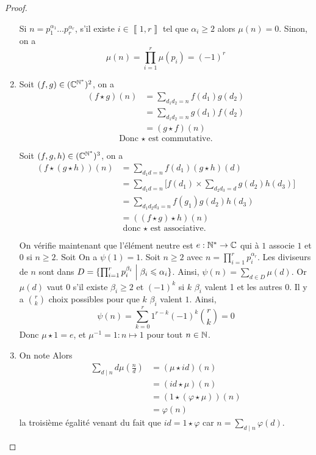 \begin{proof}
\begin{enumerate}
		Si $n=p_{1}^{\alpha_{1}}\dots p_{r}^{\alpha_{r}}$, s'il existe $i\in\left\llbracket 1,r\right\rrbracket$ tel que $\alpha_{i}\geqslant2$ alors $\mu(n)=0$. Sinon, on a 
		\begin{equation}
			\boxed{\mu(n)=\prod_{i=1}^{r}\mu(p_{i})=(-1)^{r}}
		\end{equation}

		\item Soit $(f,g)\in(\mathbb{C}^{\mathbb{N}^{*}})^{2}$, on a 
		\begin{align}
			(f\star g)(n)
			&=\sum_{d_{1}d_{2}=n}f(d_{1})g(d_{2})\\
			&=\sum_{d_{1}d_{2}=n}g(d_{1})f(d_{2})\\
			&=(g\star f)(n)
		\end{align}
		\begin{equation}
			\boxed{\text{Donc }\star\text{ est commutative.}}
		\end{equation}

		Soit $(f,g,h)\in(\mathbb{C}^{\mathbb{N}^{*}})^{3}$, on a 
		\begin{align}
			(f\star (g\star h))(n)
			&=\sum_{d_{1}d=n}f(d_{1})(g\star h)(d)\\
			&=\sum_{d_{1}d=n}\Biggl[f(d_{1})\times \sum_{d_{2}d_{3}=d}g(d_{2})h(d_{3})\Biggr]\\
			&=\sum_{d_{1}d_{2}d_{3}=n}f(g_{1})g(d_{2})h(d_{3})\\
			&=((f\star g)\star h)(n)
		\end{align}
		\begin{equation}
			\boxed{\text{donc }\star\text{ est associative. }}
		\end{equation}

		On vérifie maintenant que l'élément neutre est $e:\mathbb{N}^{*}\to\mathbb{C}$ qui à $1$ associe $1$ et 0 si $n\geqslant2$.
		Soit 
		On a $\psi(1)=1$. Soit $n\geqslant2$ avec $n=\prod_{i=1}^{r}p_{i}^{\alpha_{r}}$. Les diviseurs de $n$ sont dans $D=\{\prod_{i=1}^{r}p_{i}^{\beta_{i}}\Bigm| \beta_{i}\leqslant\alpha_{i}\}$. Ainsi, $\psi(n)=\sum_{d\in D}\mu(d)$. Or $\mu(d)$ vaut 0 s'il existe $\beta_{i}\geqslant2$ et $(-1)^{k}$ si $k$ $\beta_{i}$ valent 1 et les autres 0. Il y a $\binom{r}{k}$ choix possibles pour que $k$ $\beta_{i}$ valent $1$. Ainsi,
		\begin{equation}
			\psi(n)=\sum_{k=0}^{r}1^{r-k}(-1)^{k}\binom{r}{k}=0
		\end{equation}
		Donc $\mu\star 1=e$, et $\mu^{-1}=1\colon n\mapsto 1$ pour tout $n\in\mathbb{N}$.

		\item On note 
		Alors 
		\begin{align}
			\sum_{d\mid n}d\mu(\frac{n}{d})
			&=(\mu\star id)(n)\\
			&=(id\star \mu)(n)\\
			&=(1\star (\varphi\star \mu))(n)\\
			&=\boxed{\varphi(n)}
		\end{align}
		la troisième égalité venant du fait que $id=1\star\varphi$ car $n=\sum_{d\mid n}\varphi(d)$.
	\end{enumerate}
\end{proof}

